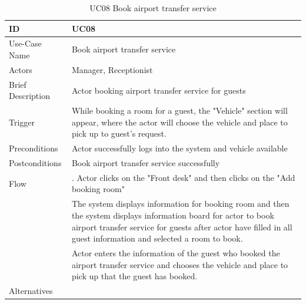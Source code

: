 \begin{table}
\begin{tabular}{|>{\raggedright\arraybackslash}p{5cm}|>{\raggedright\arraybackslash}p{10cm}|}
\hline
ID& UC08 \\
\hline
Use-Case Name& Book airport transfer service\\
\hline
Actors& Manager, Receptionist\\
\hline
Brief Description& Actor booking airport transfer service for guests \\
\hline
Trigger& While booking a room for a guest, the "Vehicle" section will appear, where the actor will choose the vehicle and place to pick up to guest's request.\\
\hline
Preconditions & Actor successfully logs into the system and vehicle available \\
\hline
Postconditions & Book airport transfer service successfully \\
\hline
Flow& 8.1. Actor clicks on the "Front desk" and then clicks on the "Add booking room"\\ & 8.2 The system displays information for booking room and then the system displays information board for actor to book airport transfer service for guests after actor have filled in all guest information and selected a room to book.\\& 8.3 Actor enters the information of the guest who booked the airport transfer service and chooses the vehicle and place to pick up that the guest has booked.
\\
\hline
Alternatives& \\
\hline
\end{tabular}

\caption{UC08 Book airport transfer service}
\label{tab:UC08}
\end{table}

